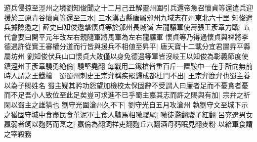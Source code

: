 遊兵侵掠至涇州之境劉知俊聞之十二月己丑解靈州圍引兵還帝急召懷貞等還遣兵迎援於三原青谷懷貞等還至三水|{
	三水漢古縣唐屬邠州九域志在州東北六十里}
知俊遣兵據險邀之|{
	薛史曰知俊邀擊懷貞等於邠州長城嶺}
左龍驤軍使壽張王彥章力戰|{
	五代會要曰開平元年改左右親隨軍將馬軍為左右龍驤軍}
懷貞等乃得過懷貞與禆將李德遇許從實王審權分道而行皆與援兵不相値至昇平|{
	唐天寶十二載分宜君置昇平縣屬坊州}
劉知俊伏兵山口懷貞大敗僅以身免德遇等軍皆沒岐王以知俊為彰義節度使鎮涇州王彥章驍勇絶倫|{
	驍堅堯翻}
每戰用二鐵槍皆重百斤一置鞍中一在手所向無前時人謂之王鐵槍　蜀蜀州刺史王宗弁稱疾罷歸成都杜門不出|{
	王宗弁鹿弁也蜀主養以為子賜姓名}
蜀主疑其矜功怨望加檢校太保固辭不受謂人曰廉者足而不憂貪者憂而不足吾小人致位至此足矣豈可求進不已乎蜀主嘉其志而許之賜與有加|{
	宗弁之祈閑以蜀主之雄猜也}
劉守光圍滄州久不下|{
	劉守光自五月攻滄州}
執劉守文至城下示之猶固守城中食盡民食堇泥軍士食人驢馬相噉騣尾|{
	噉徒濫翻騣子紅翻}
呂兖選男女羸弱者飼以麴麫而烹之|{
	羸倫為翻飼祥吏翻麴丘六翻酒母麫眠見翻麥粉}
以給軍食謂之宰殺務


